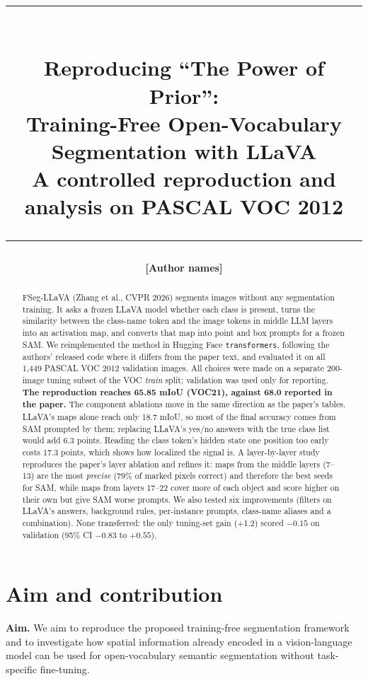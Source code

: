 \documentclass[10pt]{article}
\title{\vspace{-6mm}\rule{\linewidth}{2pt}\\[3mm]
\textbf{Reproducing ``The Power of Prior'':\\Training-Free Open-Vocabulary Segmentation with LLaVA}\\[1mm]
\large A controlled reproduction and analysis on PASCAL VOC 2012\\[-1mm]\rule{\linewidth}{0.6pt}}
\author{\textbf{[Author names]}}
\date{}
\begin{document}
\maketitle
\vspace{-8mm}

\begin{abstract}
\noindent FSeg-LLaVA (Zhang et al., CVPR 2026) segments images without any segmentation training. It asks a frozen
LLaVA model whether each class is present, turns the similarity between the class-name token and the image tokens in
middle LLM layers into an activation map, and converts that map into point and box prompts for a frozen SAM. We
reimplemented the method in Hugging Face \texttt{transformers}, following the authors' released code where it differs
from the paper text, and evaluated it on all 1{,}449 PASCAL VOC 2012 validation images. All choices were made on a
separate 200-image tuning subset of the VOC \emph{train} split; validation was used only for reporting. \textbf{The
reproduction reaches 65.85 mIoU (VOC21), against 68.0 reported in the paper.} The component ablations move in the same
direction as the paper's tables. LLaVA's maps alone reach only 18.7 mIoU, so most of the final accuracy comes from SAM
prompted by them; replacing LLaVA's yes/no answers with the true class list would add 6.3 points. Reading the class
token's hidden state one position too early costs 17.3 points, which shows how localized the signal is. A layer-by-layer study reproduces the paper's layer ablation and refines it: maps from the
middle layers (7--13) are the most \emph{precise} (79\% of marked pixels correct) and therefore the best seeds for SAM,
while maps from layers 17--22 cover more of each object and score higher on their own but give SAM worse prompts. We also tested
six improvements (filters on LLaVA's answers, background rules, per-instance prompts, class-name aliases and a
combination). None transferred: the only tuning-set gain (+1.2) scored $-0.15$ on validation (95\% CI $-0.83$ to $+0.55$).
\end{abstract}

\section{Aim and contribution}
\textbf{Aim.} We aim to reproduce the proposed training-free segmentation framework and to investigate how spatial
information already encoded in a vision-language model can be used for open-vocabulary semantic segmentation without
task-specific fine-tuning.
\end{document}
